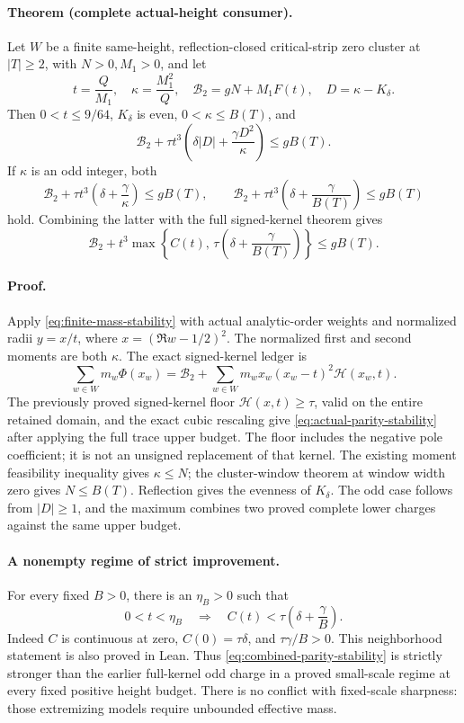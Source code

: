 \paragraph{Theorem (complete actual-height consumer).}
Let \(W\) be a finite same-height, reflection-closed critical-strip
zero cluster at \(|T|\ge2\), with \(N>0,M_1>0\), and let
\[
 t=\frac{Q}{M_1},\quad \kappa=\frac{M_1^2}{Q},\quad
 \mathcal B_2=gN+M_1F(t),\quad
 D=\kappa-K_\delta .
\]
Then \(0<t\le9/64\), \(K_\delta\) is even,
\(0<\kappa\le B(T)\), and
\begin{equation}
 \mathcal B_2+\tau t^3
   \left(\delta|D|+\frac{\gamma D^2}{\kappa}\right)
 \le gB(T).
 \label{eq:actual-parity-stability}
\end{equation}
If \(\kappa\) is an odd integer, both
\[
 \mathcal B_2+\tau t^3
   \left(\delta+\frac{\gamma}{\kappa}\right)\le gB(T),
 \qquad
 \mathcal B_2+\tau t^3
   \left(\delta+\frac{\gamma}{B(T)}\right)\le gB(T)
\]
hold.  Combining the latter with the full signed-kernel theorem gives
\begin{equation}
 \mathcal B_2+t^3
 \max\left\{C(t),\,\tau\left(\delta+\frac{\gamma}{B(T)}\right)\right\}
 \le gB(T).
 \label{eq:combined-parity-stability}
\end{equation}

\paragraph{Proof.}
Apply \eqref{eq:finite-mass-stability} with actual analytic-order
weights and normalized radii \(y=x/t\), where
\(x=(\Re w-1/2)^2\).  The normalized first and second moments
are both \(\kappa\).  The exact signed-kernel ledger is
\[
 \sum_{w\in W}m_w\Phi(x_w)
 =\mathcal B_2+
   \sum_{w\in W}m_w x_w(x_w-t)^2\mathcal H(x_w,t).
\]
The previously proved signed-kernel floor
\(\mathcal H(x,t)\ge\tau\), valid on the entire retained domain,
and the exact cubic rescaling give
\eqref{eq:actual-parity-stability} after applying the full trace
upper budget.  The floor includes the negative pole coefficient;
it is not an unsigned replacement of that kernel.
The existing moment feasibility inequality gives \(\kappa\le N\);
the cluster-window theorem at window width zero gives \(N\le B(T)\).
Reflection gives the evenness of \(K_\delta\).
The odd case follows from \(|D|\ge1\), and the maximum combines
two proved complete lower charges against the same upper budget.

\paragraph{A nonempty regime of strict improvement.}
For every fixed \(B>0\), there is an \(\eta_B>0\) such that
\[
 0<t<\eta_B
 \quad\Longrightarrow\quad
 C(t)<\tau\left(\delta+\frac{\gamma}{B}\right).
\]
Indeed \(C\) is continuous at zero, \(C(0)=\tau\delta\), and
\(\tau\gamma/B>0\).  This neighborhood statement is also proved
in Lean.  Thus \eqref{eq:combined-parity-stability} is strictly
stronger than the earlier full-kernel odd charge in a proved
small-scale regime at every fixed positive height budget.
There is no conflict with fixed-scale sharpness: those extremizing
models require unbounded effective mass.

